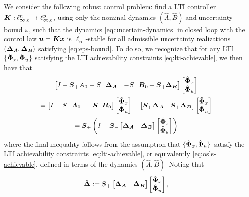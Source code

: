 We consider the following robust control problem: find a LTI controller $\tf K : \ell^n_{\infty,e} \to \ell^p_{\infty,e}$, using only the nominal dynamics $(\hat A,\hat B)$ and uncertainty bound $\eps$, such that the dynamics \eqref{eq:uncertain-dynamics} in closed loop with the control law $\uu = \K \x$ is $\ell_\infty$-stable for all admissible uncertainty realizations $(\DA,\DB)$ satisfying \eqref{eq:eps-bound}.  To do so, we recognize that for any LTI $\{\Phixh,\Phiuh\}$ satisfying the LTI achievability constraints \eqref{eq:lti-achievable}, we then have that
\begin{multline}
\begin{bmatrix} I - \Sp\A_0 - \Sp\DA & - \Sp\B_0 - \Sp\DB \end{bmatrix}\begin{bmatrix} \Phixh \\ \Phiuh \end{bmatrix} \\= \begin{bmatrix} I - \Sp\A_0 & - \Sp\B_0 \end{bmatrix}\begin{bmatrix} \Phixh \\ \Phiuh \end{bmatrix} - \begin{bmatrix} \Sp\DA & \Sp\DB \end{bmatrix}\begin{bmatrix} \Phixh \\ \Phiuh \end{bmatrix}\\ = \Sp\left(I - \Sp\begin{bmatrix} \DA & \DB \end{bmatrix}\begin{bmatrix} \Phixh \\ \Phiuh \end{bmatrix} \right)
\end{multline}
where the final inequality follows from the assumption that $\{\Phixh,\Phiuh\}$ satisfy the LTI achievability constraints \eqref{eq:lti-achievable}, or equivalently \eqref{eq:osls-achievable}, defined in terms of the dynamics $(\hat A, \hat B)$.  Noting that
\begin{equation}
\Dh := \Sp\begin{bmatrix} \DA & \DB \end{bmatrix}\begin{bmatrix} \Phixh \\ \Phiuh \end{bmatrix},
\end{equation}
